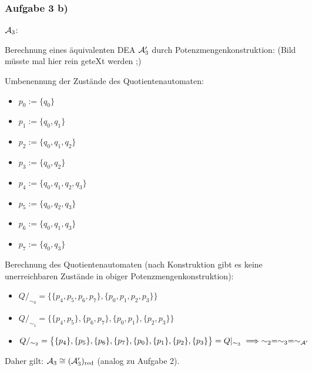 \subsubsection{Aufgabe 3 b)}
$\mathcal{A}_3$:\\
\usetikzlibrary{positioning,automata}

Berechnung eines äquivalenten DEA $\mathcal{A}_3'$ durch Potenzmengenkonstruktion: (Bild müsste mal hier rein geteXt werden ;)

Umbenennung der Zustände des Quotientenautomaten:
\begin{itemize}
	\item $p_0:=\lbrace q_0\rbrace$
	\item $p_1:=\lbrace q_0,q_1\rbrace$
	\item $p_2:=\lbrace q_0,q_1,q_2\rbrace$
	\item $p_3:=\lbrace q_0,q_2\rbrace$
	\item $p_4:=\lbrace q_0,q_1,q_2,q_3\rbrace$
	\item $p_5:=\lbrace q_0,q_2,q_3\rbrace$
	\item $p_6:=\lbrace q_0,q_1,q_3\rbrace$
	\item $p_7:=\lbrace q_0,q_3\rbrace$
\end{itemize}

Berechnung des Quotientenautomaten (nach Konstruktion gibt es keine unerreichbaren Zustände in obiger Potenzmengenkonstruktion):
\begin{itemize}
	\item $Q/_{\sim_0}=\big\lbrace\lbrace p_4,p_5,p_6,p_7\rbrace,\lbrace p_0,p_1,p_2,p_3\rbrace\big\rbrace$
	\item $Q/_{\sim_1}=\big\lbrace\lbrace p_4,p_5\rbrace,\lbrace p_6,p_7\rbrace,\lbrace p_0,p_1\rbrace,\lbrace p_2,p_3\rbrace\big\rbrace$
	\item $Q/_{\sim_2}=\big\lbrace\lbrace p_4\rbrace,\lbrace p_5\rbrace,\lbrace p_6\rbrace,\lbrace p_7\rbrace,\lbrace p_0\rbrace,\lbrace p_1\rbrace,\lbrace p_2\rbrace,\lbrace p_3\rbrace\big\rbrace=Q|_{\sim_3}\implies\sim_2=\sim_3=\sim_{\mathcal{A}'}$
\end{itemize}
Daher gilt: $\mathcal{A}_3\cong(\mathcal{A}_3')_{\text{red}}$ (analog zu Aufgabe 2).

